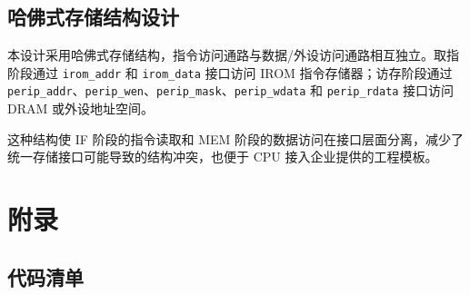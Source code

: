 \documentclass[12pt,a4paper]{ctexart}
\newcommand{\code}[1]{\texttt{#1}}
\begin{document}
\subsection{哈佛式存储结构设计}

本设计采用哈佛式存储结构，指令访问通路与数据/外设访问通路相互独立。取指阶段通过 \code{irom\_addr} 和 \code{irom\_data} 接口访问 IROM 指令存储器；访存阶段通过 \code{perip\_addr}、\code{perip\_wen}、\code{perip\_mask}、\code{perip\_wdata} 和 \code{perip\_rdata} 接口访问 DRAM 或外设地址空间。

这种结构使 IF 阶段的指令读取和 MEM 阶段的数据访问在接口层面分离，减少了统一存储接口可能导致的结构冲突，也便于 CPU 接入企业提供的工程模板。

\section{附录}

\subsection{代码清单}
\end{document}
